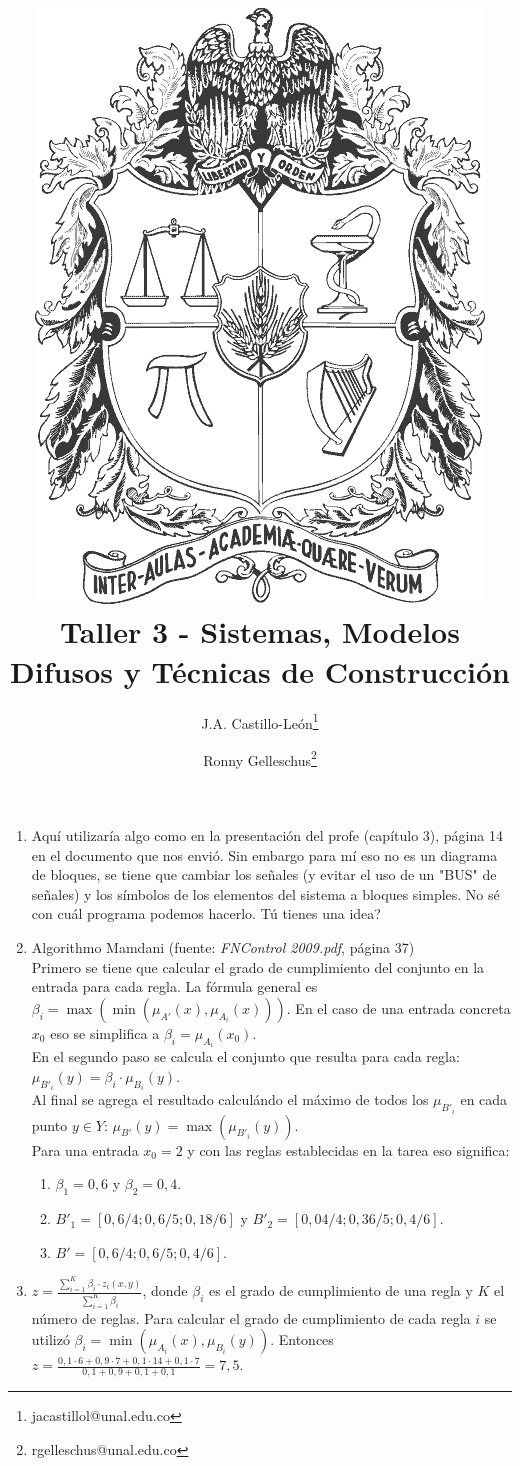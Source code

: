 \documentclass[10pt,onecolumn,twoside,letterpaper]{article}
\title{\vspace{-0.8cm}\includegraphics[scale=0.12]{unescudobn.png}\\\vspace{-0.0cm}
  \LARGE \textbf{Taller 3 - Sistemas, Modelos Difusos y T\'ecnicas de Construcci\'on}}
\author{J.A. Castillo-Le\'on\thanks{jacastillol@unal.edu.co} \and Ronny Gelleschus\thanks{rgelleschus@unal.edu.co}}
\date{}
\begin{document}
\maketitle
\begin{enumerate}
\item Aquí utilizaría algo como en la presentación del profe (capítulo 3), página 14 en el documento que nos envió. Sin embargo para mí eso no es un diagrama de bloques, se tiene que cambiar los señales (y evitar el uso de un "BUS" de señales) y los símbolos de los elementos del sistema a bloques simples. No sé con cuál programa podemos hacerlo. Tú tienes una idea?

\item Algorithmo Mamdani (fuente: \textit{FNControl 2009.pdf}, página 37)\\
  Primero se tiene que calcular el grado de cumplimiento del conjunto en la entrada para cada regla. La fórmula general es $\beta_i = \max(\min(\mu_{A'}(x),\mu_{A_i}(x)))$. En el caso de una entrada concreta $x_0$ eso se simplifica a $\beta_i=\mu_{A_i}(x_0)$.\\
  En el segundo paso se calcula el conjunto que resulta para cada regla: $\mu_{B'_i}(y)=\beta_i\cdot \mu_{B_i}(y)$.\\
  Al final se agrega el resultado calculándo el máximo de todos los $\mu_{B'_i}$ en cada punto $y\in Y$: $\mu_{B'}(y)=\max(\mu_{B'_i}(y))$.\\
  Para una entrada $x_0=2$ y con las reglas establecidas en la tarea eso significa:
  \begin{enumerate}
  \item $\beta_1=0,6$ y $\beta_2=0,4$.
  \item $B'_1=[ 0,6/4; 0,6/5; 0,18/6]$ y $B'_2=[0,04/4; 0,36/5; 0,4/6]$.
  \item $B'=[0,6/4; 0,6/5; 0,4/6]$.
  \end{enumerate}

\item $z = \frac{\sum_{i=1}^{K}\beta_i\cdot z_i(x,y)}{\sum_{i=1}^{K} \beta_i}$, donde $\beta_i$ es el grado de cumplimiento de una regla y $K$ el número de reglas. Para calcular el grado de cumplimiento de cada regla $i$ se utilizó $\beta_i=\min(\mu_{A_i}(x),\mu_{B_i}(y))$. Entonces $z= \frac{0,1\cdot 6+0,9\cdot 7+0,1\cdot 14+0,1\cdot 7}{0,1+0,9+0,1+0,1}=7,5$.


\end{enumerate}
\end{document}
